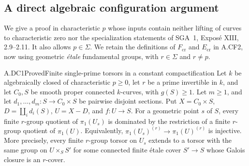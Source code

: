\subsection{A direct algebraic configuration argument}

We give a proof in characteristic $p$ whose inputs contain neither lifting
of curves to characteristic zero nor the specialization statements of
SGA~1, Expos\'e XIII, 2.9--2.11. It also allows $p\in\Sigma$.
We retain the definitions of $F_{\mathrm{cr}}$ and $E_{\mathrm{cr}}$ in
A.CF2, now using geometric \emph{\'etale} fundamental groups, with
$r\in\Sigma$ and $r\ne p$.

\begin{claim}{A.DC1}{Proved}{Finite single-prime torsors in a constant compactification}
Let $k$ be algebraically closed of characteristic $p\geq0$, let $r$ be
a prime invertible in $k$, and let $C_0,S$ be smooth proper connected
$k$-curves, with $g(S)\geq1$. Let $m\geq1$, and let
$d_1,\ldots,d_m:S\to C_0\times S$ be pairwise disjoint sections.
Put $X=C_0\times S$, $D=\coprod_i d_i(S)$, $U=X-D$, and
$f:U\to S$. For a geometric point $s$ of $S$, every finite $r$-group
quotient of $\pi_1(U_s)$ is dominated by the restriction of a finite
$r$-group quotient of $\pi_1(U)$. Equivalently,
$\pi_1(U_s)^{(r)}\to\pi_1(U)^{(r)}$ is injective.
More precisely, every finite $r$-group torsor on $U_s$ extends to a
torsor with the same group on $U\times_S S'$ for some connected
finite \'etale cover $S'\to S$ whose Galois closure is an $r$-cover.
\end{claim}

